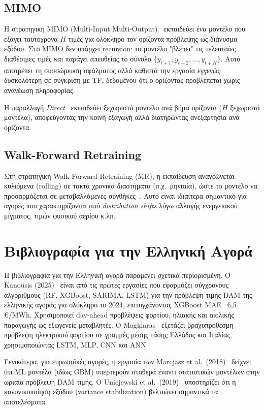 \subsection{MIMO}

Η στρατηγική MIMO (Multi-Input Multi-Output)~\cite{taieb2012review} εκπαιδεύει ένα μοντέλο που
εξάγει ταυτόχρονα $H$ τιμές για ολόκληρο τον ορίζοντα πρόβλεψης ως διάνυσμα εξόδου. Στο MIMO
δεν υπάρχει recursion: το μοντέλο "βλέπει" τις τελευταίες διαθέσιμες τιμές και παράγει απευθείας
το σύνολο $\{y_{t+1}, y_{t+2}, \ldots, y_{t+H}\}$. Αυτό αποτρέπει τη συσσώρευση σφάλματος αλλά
καθιστά την εργασία εγγενώς δυσκολότερη σε σύγκριση με TF, δεδομένου ότι ο ορίζοντας προβλέπεται
χωρίς ανανέωση πληροφορίας.

Η παραλλαγή \textit{Direct}~\cite{taieb2012review} εκπαιδεύει ξεχωριστό μοντέλο ανά βήμα ορίζοντα
($H$ ξεχωριστά μοντέλα), αποφεύγοντας την κοινή εξαγωγή αλλά διατηρώντας ανεξαρτησία ανά ορίζοντα.

\subsection{Walk-Forward Retraining}

Στη στρατηγική Walk-Forward Retraining (MR), η εκπαίδευση ανανεώνεται κυλιόμενα (rolling) σε τακτά
χρονικά διαστήματα (π.χ.\ μηνιαία), ώστε το μοντέλο να προσαρμόζεται σε μεταβαλλόμενες
συνθήκες~\cite{diebold2015forecasting}. Αυτό είναι ιδιαίτερα σημαντικό για αγορές που
χαρακτηρίζονται από \textit{distribution shifts} λόγω αλλαγής ενεργειακού μίγματος, τιμών
φυσικού αερίου κ.λπ.


\section{Βιβλιογραφία για την Ελληνική Αγορά}
\label{sec:greek_literature}

Η βιβλιογραφία για την Ελληνική αγορά παραμένει σχετικά περιορισμένη. Ο Kanousis (2025)~\cite{kanousis2025}
είναι από τις πρώτες εργασίες που εφαρμόζει σύγχρονους αλγόριθμους (RF, XGBoost, SARIMA, LSTM) για
την πρόβλεψη τιμής DAM της ελληνικής αγοράς για ολόκληρο το 2024, επιτυγχάνοντας XGBoost MAE ~6,5
€/MWh. Χρησιμοποιεί day-ahead προβλέψεις φορτίου, ηλιακής και αιολικής παραγωγής ως εξωγενείς
μεταβλητές. Ο Magklaras~\cite{magklaras2022} εξετάζει βραχυπρόθεσμη πρόβλεψη ηλεκτρικού φορτίου σε
γραμμές μέσης τάσης Ελλάδος και Ιταλίας, χρησιμοποιώντας LSTM, MLP, CNN και ANN.

Γενικότερα, για ευρωπαϊκές αγορές, η εργασία των Marcjasz et al.\ (2018)~\cite{marcjasz2018} δείχνει
ότι ML μοντέλα (ιδίως GBM) υπερτερούν σταθερά έναντι στατιστικών μοντέλων στην ωριαία πρόβλεψη
DAM τιμής. Ο Uniejewski et al.\ (2019)~\cite{uniejewski2019} υποστηρίζει ότι η κανονικοποίηση
εξόδου (variance stabilization) βελτιώνει σημαντικά τα αποτελέσματα.


